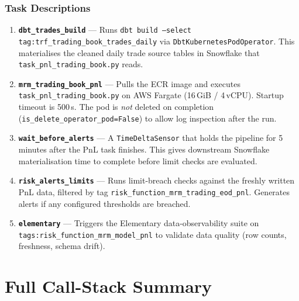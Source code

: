 \documentclass[11pt, a4paper]{article}
\begin{document}
\subsubsection{Task Descriptions}

\begin{enumerate}[noitemsep]

  \item \textbf{\texttt{dbt\_trades\_build}} —
        Runs \texttt{dbt build --select tag:trf\_trading\_book\_trades\_daily}
        via \texttt{DbtKubernetesPodOperator}.
        This materialises the cleaned daily trade source tables in
        Snowflake that \texttt{task\_pnl\_trading\_book.py} reads.

  \item \textbf{\texttt{mrm\_trading\_book\_pnl}} —
        Pulls the ECR image and executes
        \texttt{task\_pnl\_trading\_book.py} on AWS Fargate
        (16\,GiB / 4\,vCPU).
        Startup timeout is 500\,s.
        The pod is \emph{not} deleted on completion
        (\texttt{is\_delete\_operator\_pod=False}) to allow log
        inspection after the run.

  \item \textbf{\texttt{wait\_before\_alerts}} —
        A \texttt{TimeDeltaSensor} that holds the pipeline for
        5\,minutes after the PnL task finishes.
        This gives downstream Snowflake materialisation time to
        complete before limit checks are evaluated.

  \item \textbf{\texttt{risk\_alerts\_limits}} —
        Runs limit-breach checks against the freshly written PnL
        data, filtered by tag \texttt{risk\_function\_mrm\_trading\_eod\_pnl}.
        Generates alerts if any configured thresholds are breached.

  \item \textbf{\texttt{elementary}} —
        Triggers the Elementary data-observability suite on
        \texttt{tags:risk\_function\_mrm\_model\_pnl} to validate
        data quality (row counts, freshness, schema drift).

\end{enumerate}

\section{Full Call-Stack Summary}
\end{document}
